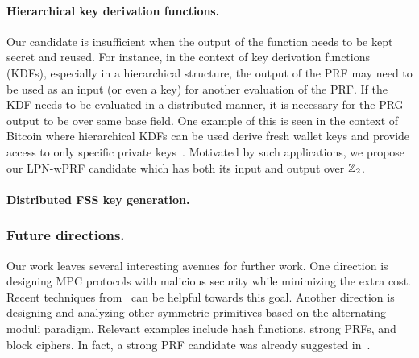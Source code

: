 \paragraph{Hierarchical key derivation functions.} 
Our \ttwPRF candidate is insufficient when the output of the function needs to be kept secret and reused. For instance, in the context of key derivation functions (KDFs), especially in a hierarchical structure, the output of the PRF may need to be used as an input (or even a key) for another evaluation of the PRF. If the KDF needs to be evaluated in a distributed manner, it is necessary for the PRG output to be over same base field. One example of this is seen in the context of Bitcoin where hierarchical KDFs can be used derive fresh wallet keys and provide access to only specific private keys~\cite{bitcoin_bip0032}. Motivated by such applications, we propose our LPN-wPRF candidate which has both its input and output over $\mathbb{Z}_2$.



\paragraph{Distributed FSS key generation.} 

\subsubsection{Future directions.} Our work leaves several interesting avenues for further work. One direction is designing MPC protocols with malicious security while minimizing the extra cost. Recent techniques from~\cite{cite} can be helpful towards this goal. Another direction is designing and analyzing other symmetric primitives based on the alternating moduli paradigm. Relevant examples include hash functions, strong PRFs, and block ciphers.  In fact, a strong PRF candidate was already suggested in~\cite{boneh2018-darkmatter}. 


